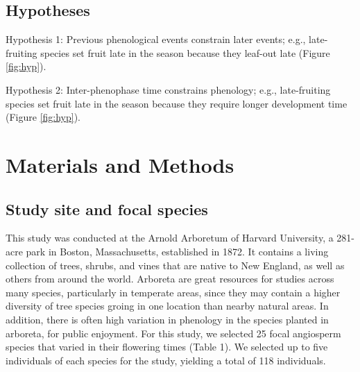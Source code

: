 \documentclass{article}
\begin{document}
\subsection* {Hypotheses}
\par Hypothesis 1: Previous phenological events constrain later events; e.g., late-fruiting species set fruit late in the season because they leaf-out late  (Figure \ref{fig:hyp}).
\par Hypothesis 2: Inter-phenophase time  constrains phenology; e.g., late-fruiting species set fruit late in the season because they require longer development time (Figure \ref{fig:hyp}).
\section* {Materials and Methods}
\subsection*{Study site and focal species}
This study was conducted at the Arnold Arboretum of Harvard University, a 281-acre park in Boston, Massachusetts, established in 1872. It contains a living collection of trees, shrubs, and vines that are native to New England, as well as others from around the world. Arboreta are great resources for studies across many species, particularly in temperate areas, since they may contain a higher diversity of tree species groing in one location than nearby natural areas. In addition, there is often high variation in phenology in the species planted in arboreta, for public enjoyment. For this study, we selected 25 focal angiosperm species that varied in their flowering times (Table 1). We selected up to five individuals of each species for the study, yielding a total of 118 individuals.
\end{document}
